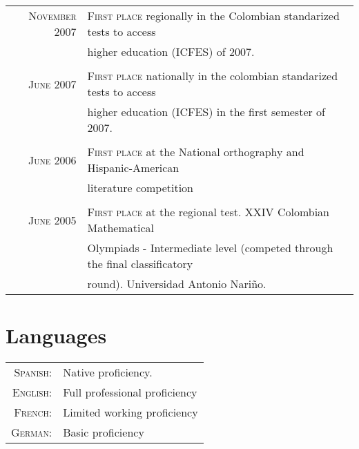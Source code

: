 \documentclass[a4paper,10pt]{article} %
\begin{document}
\begin{tabular}{rl}

\textsc{November} 2007 & \textsc{First place} regionally in the Colombian standarized tests to access \\ 
& higher education (ICFES) of 2007. \\ 
&\\

\textsc{June} 2007 & \textsc{First place} nationally in the colombian standarized tests to access  \\ 
& higher education (ICFES) in the first semester of 2007. \\ 
&\\

\textsc{June } 2006 & \textsc{First place} at the National orthography and Hispanic-American \\
& literature competition \\
&\\

\textsc{June } 2005 & \textsc{First place} at the regional test. XXIV Colombian Mathematical\\ 
& Olympiads - Intermediate level (competed through the final classificatory \\ & round). Universidad Antonio Nariño.\\

\end{tabular}


\color{OrangeRed}
\section{Languages}
\color{black}

\begin{tabular}{rl}
\textsc{Spanish:} & Native proficiency.\\

\textsc{English:} & Full professional proficiency \\

\textsc{French:} & Limited working proficiency \\

\textsc{German:} & Basic proficiency \\
\end{tabular}
\end{document}
